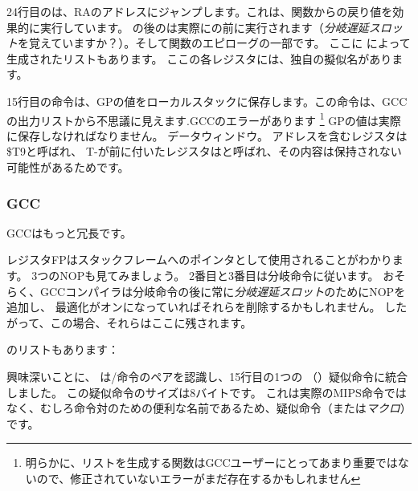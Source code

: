 
24行目のは、\ac{RA}のアドレスにジャンプします。これは、関数からの戻り値を効果的に実行しています。 
の後のは実際にの前に実行されます（\emph{分岐遅延スロット}を覚えていますか？）。そして関数のエピローグの一部です。 
ここに \IDA によって生成されたリストもあります。 ここの各レジスタには、独自の擬似名があります。



15行目の命令は、GPの値をローカルスタックに保存します。この命令は、GCCの出力リストから不思議に見えます.GCCのエラーがあります
\footnote{明らかに、リストを生成する関数はGCCユーザーにとってあまり重要ではないので、修正されていないエラーがまだ存在するかもしれません}
GPの値は実際に保存しなければなりません。 データウィンドウ。 \puts アドレスを含むレジスタは\$T9と呼ばれ、
T-が前に付いたレジスタはと呼ばれ、その内容は保持されない可能性があるためです。

\subsubsection{\NonOptimizing GCC}

\NonOptimizing GCCはもっと冗長です。



レジスタFPはスタックフレームへのポインタとして使用されることがわかります。 
3つの\ac{NOP}も見てみましょう。 
2番目と3番目は分岐命令に従います。 
おそらく、GCCコンパイラは分岐命令の後に常に\emph{分岐遅延スロット}のために\ac{NOP}を追加し、
最適化がオンになっていればそれらを削除するかもしれません。 
したがって、この場合、それらはここに残されます。

\IDA のリストもあります：




興味深いことに、 \IDA は/命令のペアを認識し、15行目の1つの
（）疑似命令に統合しました。
この疑似命令のサイズは8バイトです。 
これは実際のMIPS命令ではなく、むしろ命令対のための便利な名前であるため、疑似命令（または\emph{マクロ}）です。

